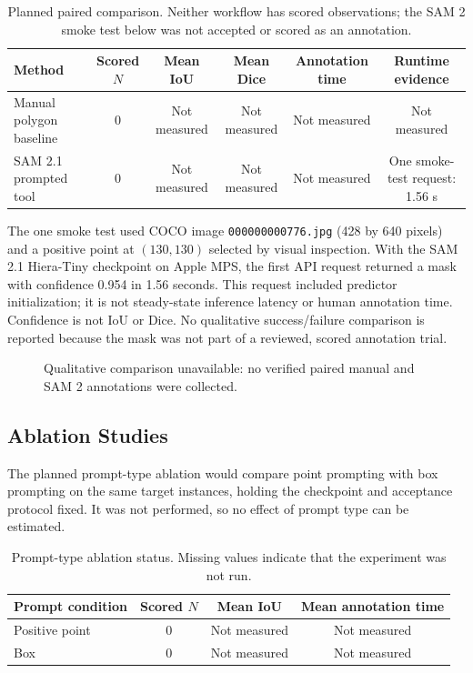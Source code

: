 \documentclass[11pt]{article}
\begin{document}
\begin{table}[ht]
\centering
\caption{Planned paired comparison. Neither workflow has scored observations;
the SAM 2 smoke test below was not accepted or scored as an annotation.}
\label{tab:main}
\begin{tabular}{@{}lccccc@{}}
\toprule
\textbf{Method} & \textbf{Scored $N$} & \textbf{Mean IoU} &
\textbf{Mean Dice} & \textbf{Annotation time} & \textbf{Runtime evidence} \\
\midrule
Manual polygon baseline & 0 & Not measured & Not measured &
Not measured & Not measured \\
SAM 2.1 prompted tool & 0 & Not measured & Not measured &
Not measured & One smoke-test request: 1.56 s \\
\bottomrule
\end{tabular}
\end{table}

The one smoke test used COCO image \texttt{000000000776.jpg} (428 by 640
pixels) and a positive point at $(130,130)$ selected by visual inspection.
With the SAM 2.1 Hiera-Tiny checkpoint on Apple MPS, the first API request
returned a mask with confidence 0.954 in 1.56 seconds. This request included
predictor initialization; it is not steady-state inference latency or
human annotation time. Confidence is not IoU or Dice. No qualitative
success/failure comparison is reported because the mask was not part of a
reviewed, scored annotation trial.

\begin{figure}[ht]
\centering
{}
\caption{Qualitative comparison unavailable: no verified paired manual and
SAM 2 annotations were collected.}
\label{fig:qual}
\end{figure}

\subsection{Ablation Studies}
\label{sec:ablation}
The planned prompt-type ablation would compare point prompting with box
prompting on the same target instances, holding the checkpoint and acceptance
protocol fixed. It was not performed, so no effect of prompt type can be
estimated.

\begin{table}[ht]
\centering
\caption{Prompt-type ablation status. Missing values indicate that the
experiment was not run.}
\label{tab:ablation}
\begin{tabular}{@{}lccc@{}}
\toprule
\textbf{Prompt condition} & \textbf{Scored $N$} & \textbf{Mean IoU} &
\textbf{Mean annotation time} \\
\midrule
Positive point & 0 & Not measured & Not measured \\
Box & 0 & Not measured & Not measured \\
\bottomrule
\end{tabular}
\end{table}
\end{document}
